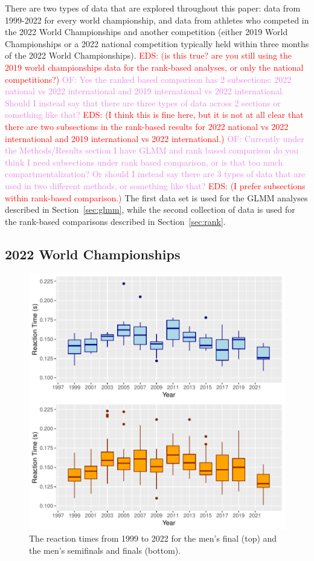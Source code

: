 \documentclass[12pt, letterpaper, titlepage]{article}
\newcommand{\eds}[1]{\textcolor{red}{EDS: (#1)}}
\newcommand{\of}[1]{\textcolor{violet}{OF: #1}}
\begin{document}
There are two types of data that are explored throughout this paper: data from
1999-2022 for every world championship, and data from athletes who competed in
the 2022 World Championships and another competition (either 2019 World 
Championships or a 2022 national competition typically held within three months 
of the 2022 World Championships). 
\eds{is this true? are you still using the 2019 world championships data for the
rank-based analyses, or only the national competitions?}
\of{Yes the ranked based comparison has 2 subsections: 2022 national vs 2022
international and 2019 international vs 2022 international.  Should I instead say
that there are three types of data across 2 sections or something like that?}
\eds{I think this is fine here, but it is not at all clear that there are two
subsections in the rank-based results for 2022 national vs 2022
international and 2019 international vs 2022 international.}
\of{Currently under the Methods/Results section I have GLMM and rank based comparison
do you think I need subsections under rank based comparison, or is that too much
compartmentalization?  Or should I instead say there are 3 types of data that are
used in two different methods, or something like that?} \eds{I prefer
subsections within rank-based comparison.}
The first data set is used for the GLMM analyses described in 
Section~\ref{sec:glmm}, while the second collection of data is used for the 
rank-based comparisons described in Section~\ref{sec:rank}.


\subsection{2022 World Championships}\label{sec:dataworld}

\begin{figure}[tbp]
  \centering
  \includegraphics{Finals_Pooled_Boxplot}
  \caption{The reaction times from 1999 to 2022 for the men's final (top) and
  the men's semifinals and finals (bottom).}
  \label{fig:Boxplots}
\end{figure}
\end{document}
